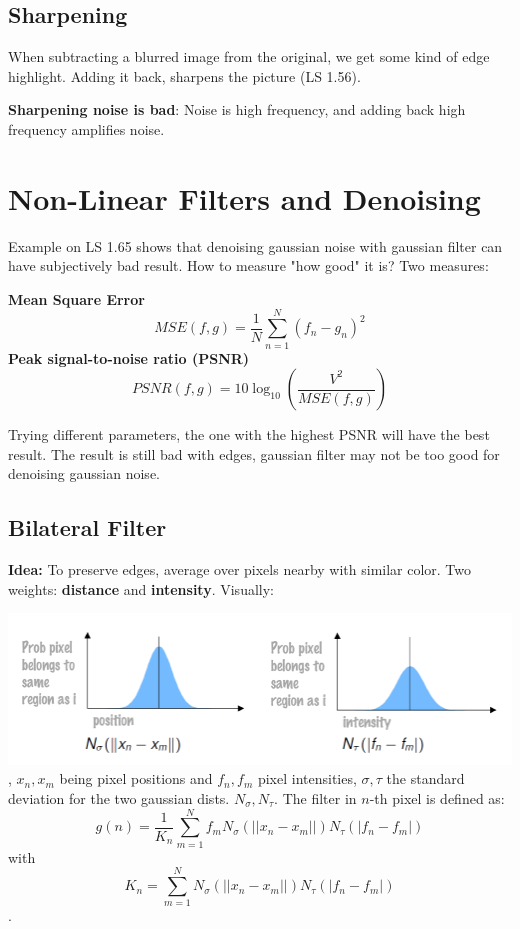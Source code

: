 \subsection{Sharpening}
When subtracting a blurred image from the original, we get some kind of edge highlight. Adding it back, sharpens the picture (LS 1.56).

\textbf{Sharpening noise is bad}: Noise is high frequency, and adding back high frequency amplifies noise.

\section{Non-Linear Filters and Denoising}

Example on LS 1.65 shows that denoising gaussian noise with gaussian filter can have subjectively bad result. How to measure "how good" it is? Two measures:

\textbf{Mean Square Error} $$MSE(f,g) = \frac{1}{N} \sum\limits_{n=1}^N (f_n - g_n)^2$$
\textbf{Peak signal-to-noise ratio (PSNR)} $$PSNR(f,g) = 10 \log_{10} \left(\dfrac{V^2}{MSE(f,g)}\right)$$

Trying different parameters, the one with the highest PSNR will have the best result. The result is still bad with edges, gaussian filter may not be too good for denoising gaussian noise.

\subsection{Bilateral Filter}  

\textbf{Idea:} To preserve edges, average over pixels nearby with similar color. Two weights: \textbf{distance} and \textbf{intensity}. Visually:

\includegraphics[width=\textwidth]{images/chap1/bilateral}, $x_n,x_m$ being pixel positions and $f_n, f_m$ pixel intensities, $\sigma, \tau$ the standard deviation for the two gaussian dists. $N_\sigma, N_\tau$. The filter in $n$-th pixel is defined as: $$g(n) = \dfrac{1}{K_n} \sum\limits_{m=1}^N f_m N_\sigma(||x_n - x_m||) N_\tau (|f_n -f_m|)$$ with $$K_n = \sum\limits_{m=1}^N N_\sigma(||x_n - x_m||) N_\tau (|f_n -f_m|)$$.

